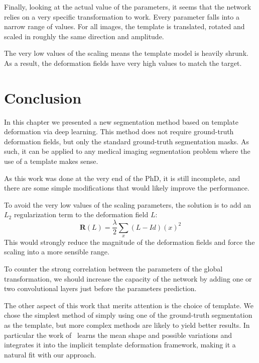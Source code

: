 Finally, looking at the actual value of the parameters, it seems that the network relies on a very specific transformation to work. Every parameter falls into a narrow range of values. For all images, the template is translated, rotated and scaled in roughly the same direction and amplitude. 

The very low values of the scaling means the template model is heavily shrunk. As a result, the deformation fields have very high values to match the target. %



\section{Conclusion}

In this chapter we presented a new segmentation method based on template deformation via deep learning. This method does not require ground-truth deformation fields, but only the standard ground-truth segmentation masks. As such, it can be applied to any medical imaging segmentation problem where the use of a template makes sense.

As this work was done at the very end of the PhD, it is still incomplete, and there are some simple modifications that would likely improve the performance. 

To avoid the very low values of the scaling parameters, the solution is to add an $L_2$ regularization term to the deformation field $L$:
\begin{equation}
    \mathbf{R} \left( L \right) = \frac{\lambda}{2} \sum_x \left( L - Id \right)(x)^2
\end{equation}
This would strongly reduce the magnitude of the deformation fields and force the scaling into a more sensible range. 

To counter the strong correlation between the parameters of the global transformation, we should increase the capacity of the network by adding one or two convolutional layers just before the parameters prediction.

The other aspect of this work that merits attention is the choice of template. We chose the simplest method of simply using one of the ground-truth segmentation as the template, but more complex methods are likely to yield better results. In particular the work of~\textcite{prevost2013PHD} learns the mean shape and possible variations and integrates it into the implicit template deformation framework, making it a natural fit with our approach.

